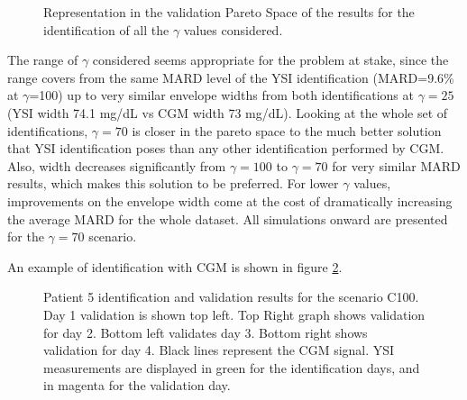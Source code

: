 \begin{figure}[hbtp]
\centering
{}\caption{Representation in the validation Pareto Space of the results for the identification of all the $\gamma$ values considered.}
\label{fig:CGMpareto}
\end{figure}

The range of $\gamma$ considered seems appropriate for the problem at stake, since the range covers from the same MARD level of the YSI identification (MARD=9.6\% at $\gamma$=100) up to very similar envelope widths from both identifications at $\gamma=25$ (YSI width 74.1 mg/dL vs CGM width 73 mg/dL). Looking at the whole set of identifications, $\gamma=70$ is closer in the pareto space to the much better solution that YSI identification poses than any other identification performed by CGM. Also, width decreases significantly from $\gamma=100$ to $\gamma=70$ for very similar MARD results, which makes this solution to be preferred. For lower $\gamma$ values, improvements on the envelope width come at the cost of dramatically increasing the average MARD for the whole dataset. All simulations onward are presented for the $\gamma=70$ scenario.

An example of identification with CGM is shown in figure \ref{fig:CGMpatient5}.

\begin{figure}[hbt]
\centering
{}\caption{Patient 5 identification and validation results for the scenario C100. Day 1 validation is shown top left. Top Right graph shows validation for day 2. Bottom left validates day 3. Bottom right shows validation for day 4. Black lines represent the CGM signal. YSI measurements are displayed in green for the identification days, and in magenta for the validation day.}
\label{fig:CGMpatient5}
\end{figure}

